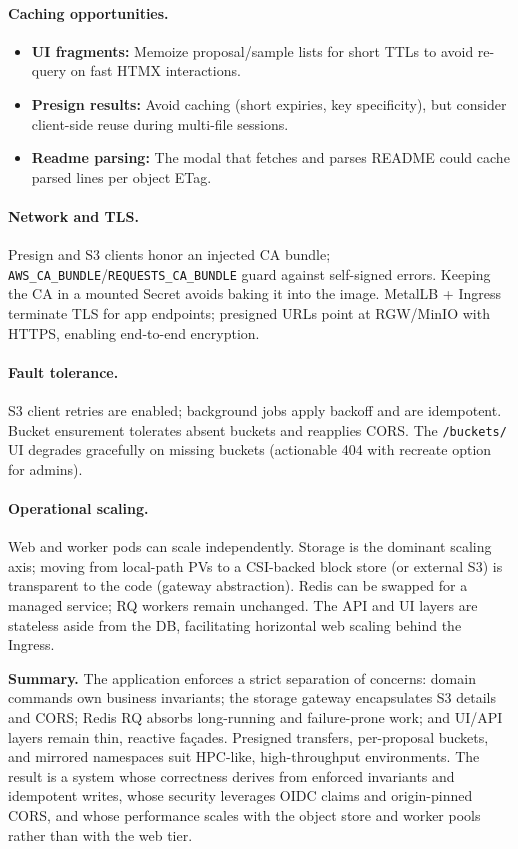 \paragraph{Caching opportunities.}
\begin{itemize}
	\item \textbf{UI fragments:} Memoize proposal/sample lists for short TTLs to avoid re-query on fast HTMX interactions.
	\item \textbf{Presign results:} Avoid caching (short expiries, key specificity), but consider client-side reuse during multi-file sessions.
	\item \textbf{Readme parsing:} The modal that fetches and parses README could cache parsed lines per object ETag.
\end{itemize}

\paragraph{Network and TLS.}
Presign and S3 clients honor an injected CA bundle; \texttt{AWS\_CA\_BUNDLE}/\texttt{REQUESTS\_CA\_BUNDLE} guard against self-signed errors. Keeping the CA in a mounted Secret avoids baking it into the image. MetalLB + Ingress terminate TLS for app endpoints; presigned URLs point at RGW/MinIO with HTTPS, enabling end-to-end encryption.

\paragraph{Fault tolerance.}
S3 client retries are enabled; background jobs apply backoff and are idempotent. Bucket ensurement tolerates absent buckets and reapplies CORS. The \texttt{/buckets/} UI degrades gracefully on missing buckets (actionable 404 with recreate option for admins).

\paragraph{Operational scaling.}
Web and worker pods can scale independently. Storage is the dominant scaling axis; moving from local-path PVs to a CSI-backed block store (or external S3) is transparent to the code (gateway abstraction). Redis can be swapped for a managed service; RQ workers remain unchanged. The API and UI layers are stateless aside from the DB, facilitating horizontal web scaling behind the Ingress.

\bigskip

\noindent\textbf{Summary.}
The application enforces a strict separation of concerns: domain commands own business invariants; the storage gateway encapsulates S3 details and CORS; Redis RQ absorbs long-running and failure-prone work; and UI/API layers remain thin, reactive façades. Presigned transfers, per-proposal buckets, and mirrored namespaces suit HPC-like, high-throughput environments. The result is a system whose correctness derives from enforced invariants and idempotent writes, whose security leverages OIDC claims and origin-pinned CORS, and whose performance scales with the object store and worker pools rather than with the web tier.